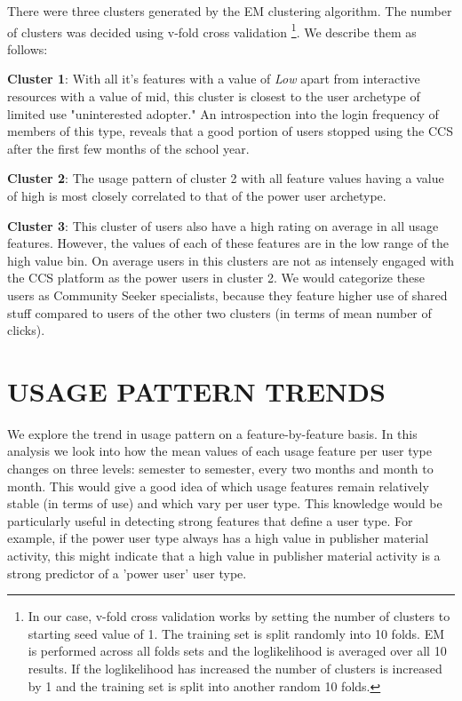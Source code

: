 \documentclass{acm_proc_article-sp}
\begin{document}
There were three clusters generated by the EM clustering algorithm. The number of clusters was decided using v-fold cross validation \footnote{In our case, v-fold cross validation works by setting the number of clusters to starting seed value of 1. The training set is split randomly into 10 folds. EM is performed across all folds sets and the loglikelihood is averaged over all 10 results. If the loglikelihood has increased the number of clusters is increased by 1 and the training set is split into another random 10 folds.}. We describe them as follows:

\textbf{Cluster 1}: With all it's features with a value of \textit{Low} apart from interactive resources with a value of mid, this cluster is closest to the user archetype of limited use "uninterested adopter." An introspection into the login frequency of members of this type, reveals that a good portion of users stopped using the CCS after the first few months of the school year.

\textbf{Cluster 2}: The usage pattern of cluster 2 with all feature values having a value of high is most closely correlated to that of the power user archetype.

\textbf{Cluster 3}: This cluster of users also have a high rating on average in all usage features. However, the values of each of these features are in the low range of the high value bin. On average users in this clusters are not as intensely engaged with the CCS platform as the power users in cluster 2. We would categorize these users as Community Seeker specialists, because they feature higher use of shared stuff compared to users of the other two clusters (in terms of mean number of clicks).

\section{USAGE PATTERN TRENDS}
We explore the trend in usage pattern on a feature-by-feature basis. In this analysis we look into how the mean values of each usage feature per user type changes on three levels: semester to semester, every two months and month to month. This would give a good idea of which usage features remain relatively stable (in terms of use) and which vary per user type. This knowledge would be particularly useful in detecting strong features that define a user type. For example, if the power user type always has a high value in  publisher material activity, this  might indicate that a high value in publisher material activity is a strong predictor of a 'power user' user type.
\end{document}
